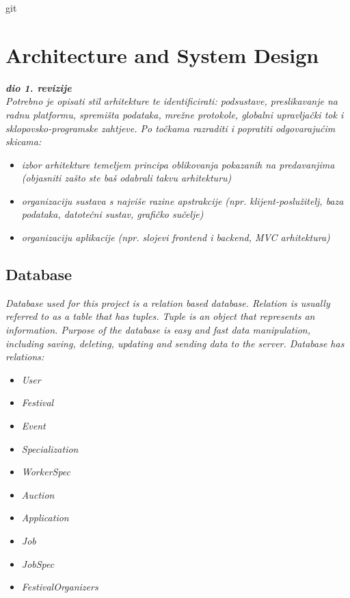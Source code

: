git \chapter{Architecture and System Design}
		
		\textbf{\textit{dio 1. revizije}}\\

		\textit{ Potrebno je opisati stil arhitekture te identificirati: podsustave, preslikavanje na radnu platformu, spremišta podataka, mrežne protokole, globalni upravljački tok i sklopovsko-programske zahtjeve. Po točkama razraditi i popratiti odgovarajućim skicama:}
	\begin{itemize}
		\item 	\textit{izbor arhitekture temeljem principa oblikovanja pokazanih na predavanjima (objasniti zašto ste baš odabrali takvu arhitekturu)}
		\item 	\textit{organizaciju sustava s najviše razine apstrakcije (npr. klijent-poslužitelj, baza podataka, datotečni sustav, grafičko sučelje)}
		\item 	\textit{organizaciju aplikacije (npr. slojevi frontend i backend, MVC arhitektura) }		
	\end{itemize}

	
		

		

				
		\section{Database}
			
			
		\textit{Database used for this project is a relation based database. Relation is usually referred to as a table that has tuples. Tuple is an object that represents an information. Purpose of the database is easy and fast data manipulation, including saving, deleting, updating and sending data to the server. Database has relations:}
	\begin{itemize}
			\item 	\textit{User}
			\item 	\textit{Festival}
			\item 	\textit{Event}
			\item 	\textit{Specialization}
			\item 	\textit{WorkerSpec}
			\item 	\textit{Auction}
			\item 	\textit{Application}
			\item 	\textit{Job}
			\item 	\textit{JobSpec}
			\item 	\textit{FestivalOrganizers}



		\end{itemize}
		
